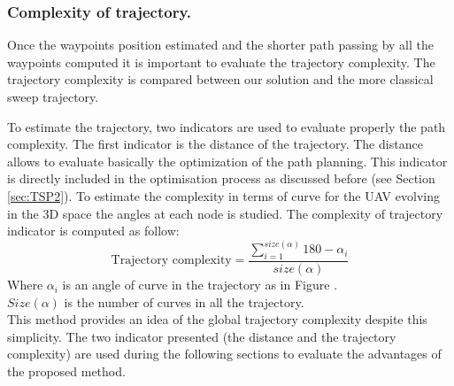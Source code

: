  
\subsubsection*{Complexity of trajectory. }\label{tarjectory}

Once the waypoints position estimated and the shorter path passing by all the waypoints computed it is important to evaluate the trajectory complexity. %
The trajectory complexity is compared between our solution and the more classical sweep trajectory.
 
To estimate the trajectory, two indicators are used to evaluate properly the path complexity. The first indicator is the distance of the trajectory. The distance allows to evaluate basically the optimization of the path planning. This indicator is directly included in the optimisation process as discussed before (see Section \ref{sec:TSP2}). 
To estimate the complexity in terms of curve for the UAV evolving in the 3D space the angles at each node is studied. 
The complexity of trajectory indicator is computed as follow: 
\begin{equation}\label{Eq:trajectory}
\mbox{Trajectory complexity}=\frac{ \sum_{i=1}^{size(\alpha)} 180- \alpha_{i}  }{size(\alpha)}   
\end{equation}
Where $\alpha_i$ is an angle of curve in the trajectory as in Figure . \\
$Size(\alpha)$ is the number of curves in all the trajectory.\\ 
This method provides an idea of the global trajectory complexity despite this simplicity. 
The two indicator presented (the distance and the trajectory complexity) are used during the following sections to evaluate the advantages of the proposed method.
	

